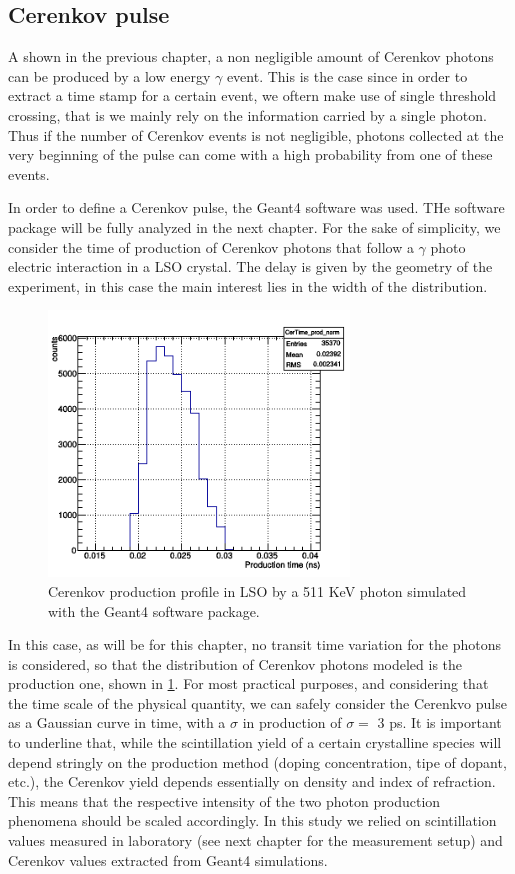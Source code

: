 \subsection{Cerenkov pulse}
A shown in the previous chapter, a non negligible amount of Cerenkov photons can be produced by a low energy $\gamma$ event. This is the case since in order to extract a time stamp for a certain event, we oftern make use of single threshold crossing, that is we mainly rely on the information carried by a single photon. Thus if the number of Cerenkov events is not negligible, photons collected at the very beginning of the pulse can come with a high probability from one of these events.

In order to define a Cerenkov pulse, the Geant4 software was used. THe software package will be fully analyzed in the next chapter. For the sake of simplicity, we consider the time of production of Cerenkov photons that follow a $\gamma$ photo electric interaction in a LSO crystal. The delay is given by the geometry of the experiment, in this case the main interest lies in the width of the distribution.
\begin{figure}[htbp]
\begin{center}
\includegraphics[width=8cm]{../Pictures/Chapter_4/cerenkov_time.png}
\end{center}
\caption[Cerenkov production]{Cerenkov production profile in LSO by a 511 KeV photon simulated with the Geant4 software package.}
\label{fig:cer_see}
\end{figure}
In this case, as will be for this chapter, no transit time variation for the photons is considered, so that the distribution of Cerenkov photons modeled is the production one, shown in \ref{fig:cer_see}. 
For most practical purposes, and considering that the time scale of the physical quantity, we can safely consider the Cerenkvo pulse as a Gaussian curve in time, with a $\sigma$ in production of $\sigma =$ 3 ps.
It is important to underline that, while the scintillation yield of a certain crystalline species will depend stringly on the production method (doping concentration, tipe of dopant, etc.), the Cerenkov yield depends essentially on density and index of refraction. This means that the respective intensity of the two photon production phenomena should be scaled accordingly. In this study we relied on scintillation values measured in laboratory (see next chapter for the measurement setup) and Cerenkov values extracted from Geant4 simulations.

